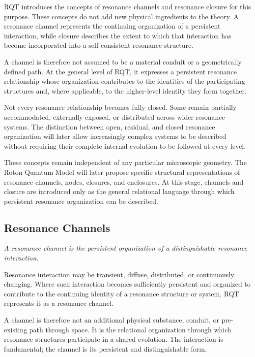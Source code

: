 \documentclass[11pt,a4paper]{article}
\begin{document}
RQT introduces the concepts of resonance channels and resonance closure for this purpose. These concepts do not add new physical ingredients to the theory. A resonance channel represents the continuing organization of a persistent interaction, while closure describes the extent to which that interaction has become incorporated into a self-consistent resonance structure.

A channel is therefore not assumed to be a material conduit or a geometrically defined path. At the general level of RQT, it expresses a persistent resonance relationship whose organization contributes to the identities of the participating structures and, where applicable, to the higher-level identity they form together.

Not every resonance relationship becomes fully closed. Some remain partially accommodated, externally exposed, or distributed across wider resonance systems. The distinction between open, residual, and closed resonance organization will later allow increasingly complex systems to be described without requiring their complete internal evolution to be followed at every level.

These concepts remain independent of any particular microscopic geometry. The Roton Quantum Model will later propose specific structural representations of resonance channels, nodes, closures, and enclosures. At this stage, channels and closure are introduced only as the general relational language through which persistent resonance organization can be described.


\subsection{Resonance Channels}

\emph{A resonance channel is the persistent organization of a distinguishable resonance interaction.}
\vspace{0.6em} 

Resonance interaction may be transient, diffuse, distributed, or continuously changing. Where such interaction becomes sufficiently persistent and organized to contribute to the continuing identity of a resonance structure or system, RQT represents it as a resonance channel.

A channel is therefore not an additional physical substance, conduit, or pre-existing path through space. It is the relational organization through which resonance structures participate in a shared evolution. The interaction is fundamental; the channel is its persistent and distinguishable form.
\end{document}
